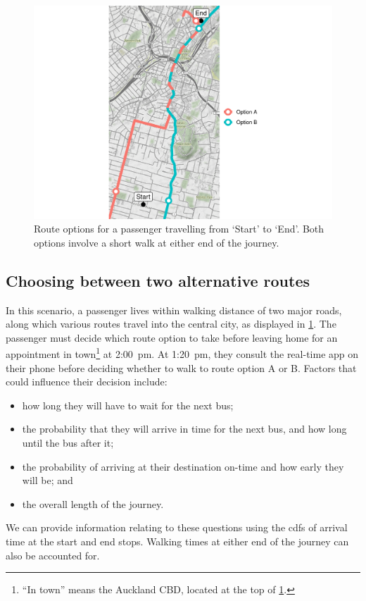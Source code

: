 \begin{knitrout}\small
{}\color{fgcolor}\begin{figure}

{\centering \includegraphics[width=\textwidth]{figure/eta_journey_arrival_prep-1} 

}

\caption[Route options for a passenger travelling from origin to desination]{Route options for a passenger travelling from `Start' to `End'. Both options involve a short walk at either end of the journey.}\label{fig:eta_journey_arrival_prep}
\end{figure}


\end{knitrout}

\subsection{Choosing between two alternative routes}
\label{sec:journey_simple}

In this scenario, a passenger lives within walking distance of two major roads, along which various routes travel into the central city, as displayed in \cref{fig:eta_journey_arrival_prep}. The passenger must decide which route option to take before leaving home for an appointment in town\footnote{``In town'' means the Auckland CBD, located at the top of \cref{fig:eta_journey_arrival_prep}.} at  2:00~pm. At  1:20~pm, they consult the real-time app on their phone before deciding whether to walk to route option A or B. Factors that could influence their decision include:
\begin{itemize}
\item how long they will have to wait for the next bus;
\item the probability that they will arrive in time for the next bus, and how long until the bus after it;
\item the probability of arriving at their destination on-time and how early they will be; and
\item the overall length of the journey.
\end{itemize}
We can provide information relating to these questions using the \glspl{cdf} of arrival time at the start and end stops. Walking times at either end of the journey can also be accounted for.


